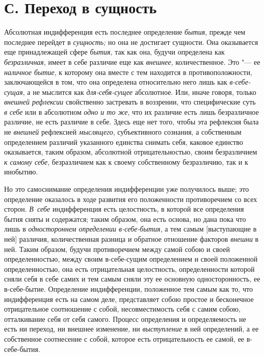\section[С. Переход в сущность]{С. Переход в сущность}

Абсолютная индифференция есть последнее определение {\em бытия}, прежде чем
последнее перейдет в {\em сущность;} но она не достигает сущности. Она
оказывается еще принадлежащей сфере {\em бытия}, так как она, будучи определена
как {\em безразличная}, имеет в себе различие еще как {\em внешнее},
количественное. Это "--- ее {\em наличное бытие}, к которому она вместе с тем
находится в противоположности, заключающейся в том, что она определена
относительно него лишь как {\em в-себе-сущая}, а не мыслится как
{\em для-себя-сущее} абсолютное. Или, иначе говоря, только {\em внешней
рефлексии} свойственно застревать в воззрении, что специфические суть {\em в
себе} или в абсолютном {\em одно и то же}, что их различие есть лишь
безразличное различие, не есть различие в себе. Здесь еще нет того, чтобы эта
рефлексия была не {\em внешней} рефлексией {\em мыслящего}, субъективного
сознания, а собственным определением различий указанного единства снимать себя,
каковое единство оказывается, таким образом, абсолютной отрицательностью, своим
безразличием {\em к самому себе}, безразличием как к своему собственному
безразличию, так и к инобытию.

Но это самоснимание определения индифференции уже получилось выше; это
определение оказалось в ходе развития его положенности противоречием со всех
сторон. {\em В~себе} индифференция есть целостность, в которой все определения
бытия сняты и содержатся; таким образом, она есть основа, но дана пока что лишь
в {\em одностороннем определении в-себе-бытия}, а тем самым [выступающие в ней]
различия, количественная разница и обратное отношение факторов {\em внешни} в
ней. Таким образом, будучи противоречием между самой собою и своей
определенностью, между своим в-себе-сущим определением и своей положенной
определенностью, она есть отрицательная целостность, определенности которой
сняли себя в себе самих и тем самым сняли эту ее основную односторонность, ее
в-себе-бытие. Определение индифференции, положенное тем самым как то, что
индифференция есть на самом деле, представляет собою простое и бесконечное
отрицательное соотношение с собой, несовместимость себя с самим собою,
отталкивание себя от себя самого. Процесс определения и определяемость не есть
ни переход, ни внешнее изменение, ни {\em выступление} в ней определений, а ее
собственное соотнесение с собой, которое есть отрицательность ее самой, ее
в-себе-бытия.

